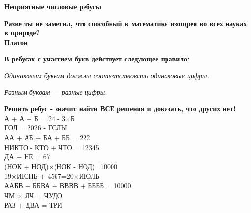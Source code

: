 \centerline{\bf \Huge Неприятные числовые ребусы}

\begin{flushright}
        \scriptsize{\textbf{Разве ты не заметил, что способный к математике изощрен во всех науках в природе?\\
         Платон}}
        
\end{flushright}

\textbf{В ребусах с участием букв действует следующее правило: }

\textit{Одинаковым буквам должны соответствовать одинаковые цифры.}

\textit{Разным буквам — разные цифры.}


\textbf{Решить ребус - значит найти ВСЕ решения и доказать, что других нет!}\\


 А + А + Б = 24 - 3$\times$Б \\

 ГОЛ = 2026 - ГОЛЫ\\

 АА + АБ + БА + ББ = 222\\

 НИКТО - КТО + ЧТО = 12345\\

 ДА + НЕ = 67\\

 (НОК + НОД)$\times$(НОК - НОД)=10000\\

 19$\times$ИЮНЬ + 4567=20$\times$ИЮЛЬ\\

 ААБВ + ББВА + ВВВВ + ББББ = 10000\\

 ЧМ $\times$ ЛЧ = ЧУДО\\

 РАЗ + ДВА = ТРИ




